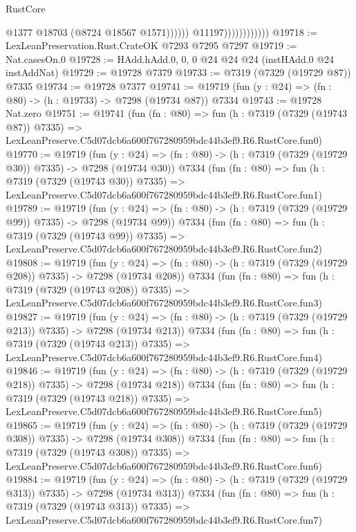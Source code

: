 \begin{lexlean}{RustCore}
\begin{coremodule}
                                      @1377
                                      @18703
                                      (@8724 @18567 @1571))))))
                            @11197))))))))))))
@19718 := LexLeanPreservation.Rust.CrateOK @7293 @7295 @7297
@19719 := Nat.casesOn.{0}
@19728 := HAdd.hAdd.{0, 0, 0} @24 @24 @24 (instHAdd.{0} @24 instAddNat)
@19729 := @19728 @7379
@19733 := @7319 (@7329 (@19729 @87)) @7335
@19734 := @19728 @7377
@19741 := @19719 (fun (y : @24) => (fn : @80) -> (h : @19733) -> @7298 (@19734 @87)) @7334
@19743 := @19728 Nat.zero
@19751 := @19741
    (fun (fn : @80) =>
    fun (h : @7319 (@7329 (@19743 @87)) @7335) =>
    LexLeanPreserve.C5d07dcb6a600f767280959bdc44b3ef9.R6.RustCore.fun0)
@19770 := @19719
    (fun (y : @24) => (fn : @80) -> (h : @7319 (@7329 (@19729 @30)) @7335) -> @7298 (@19734 @30))
    @7334
    (fun (fn : @80) =>
    fun (h : @7319 (@7329 (@19743 @30)) @7335) =>
    LexLeanPreserve.C5d07dcb6a600f767280959bdc44b3ef9.R6.RustCore.fun1)
@19789 := @19719
    (fun (y : @24) => (fn : @80) -> (h : @7319 (@7329 (@19729 @99)) @7335) -> @7298 (@19734 @99))
    @7334
    (fun (fn : @80) =>
    fun (h : @7319 (@7329 (@19743 @99)) @7335) =>
    LexLeanPreserve.C5d07dcb6a600f767280959bdc44b3ef9.R6.RustCore.fun2)
@19808 := @19719
    (fun (y : @24) => (fn : @80) -> (h : @7319 (@7329 (@19729 @208)) @7335) -> @7298 (@19734 @208))
    @7334
    (fun (fn : @80) =>
    fun (h : @7319 (@7329 (@19743 @208)) @7335) =>
    LexLeanPreserve.C5d07dcb6a600f767280959bdc44b3ef9.R6.RustCore.fun3)
@19827 := @19719
    (fun (y : @24) => (fn : @80) -> (h : @7319 (@7329 (@19729 @213)) @7335) -> @7298 (@19734 @213))
    @7334
    (fun (fn : @80) =>
    fun (h : @7319 (@7329 (@19743 @213)) @7335) =>
    LexLeanPreserve.C5d07dcb6a600f767280959bdc44b3ef9.R6.RustCore.fun4)
@19846 := @19719
    (fun (y : @24) => (fn : @80) -> (h : @7319 (@7329 (@19729 @218)) @7335) -> @7298 (@19734 @218))
    @7334
    (fun (fn : @80) =>
    fun (h : @7319 (@7329 (@19743 @218)) @7335) =>
    LexLeanPreserve.C5d07dcb6a600f767280959bdc44b3ef9.R6.RustCore.fun5)
@19865 := @19719
    (fun (y : @24) => (fn : @80) -> (h : @7319 (@7329 (@19729 @308)) @7335) -> @7298 (@19734 @308))
    @7334
    (fun (fn : @80) =>
    fun (h : @7319 (@7329 (@19743 @308)) @7335) =>
    LexLeanPreserve.C5d07dcb6a600f767280959bdc44b3ef9.R6.RustCore.fun6)
@19884 := @19719
    (fun (y : @24) => (fn : @80) -> (h : @7319 (@7329 (@19729 @313)) @7335) -> @7298 (@19734 @313))
    @7334
    (fun (fn : @80) =>
    fun (h : @7319 (@7329 (@19743 @313)) @7335) =>
    LexLeanPreserve.C5d07dcb6a600f767280959bdc44b3ef9.R6.RustCore.fun7)

\end{coremodule}
\end{lexlean}
